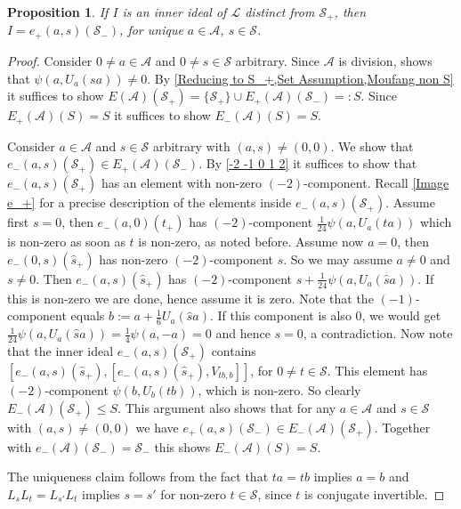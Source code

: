 \documentclass[oneside,a4paper]{amsart} %
\newtheorem{proposition}[theorem]{Proposition}
\theoremstyle{definition}
\newcommand{\A}{\mathcal{A}}
\renewcommand{\SS}{\mathcal{S}}
\newcommand{\LL}{\mathcal{L}}
\numberwithin{equation}{section}
\begin{document}
\begin{proposition}
\label{Moufang skews inner}
	If $I$ is an inner ideal of $\LL$ distinct from $\mathcal S_+$, then $I=e_+(a,s)(\SS_-)$, for unique $a\in\mathcal A$, $s\in\mathcal S$.
\end{proposition}
\begin{proof}
	Consider $0\neq a\in\A$ and $0\neq s\in\SS$ arbitrary.
	Since $\A$ is division, \cite[Lemma 3.3.4(ii)]{Boelaert2019} shows that $\psi(a,U_a(sa))\neq 0$.
	By \cref{Reducing to S_+,Set Assumption,Moufang non S} it suffices to show $E(\A)(\SS_+)=\{\SS_+\}\cup E_+(\A)(\SS_-)=:S$.
	Since $E_+(\A)(S)=S$ it suffices to show $E_-(\A)(S)=S$.
	
	Consider $a\in\A$ and $s\in\SS$ arbitrary with $(a,s)\neq (0,0)$.
	We show that $e_-(a,s)(\SS_+)\in E_+(\A)(\SS_-)$.
	By \cref{-2 -1 0 1 2} it suffices to show that $e_-(a,s)(\SS_+)$ has an element with non-zero $(-2)$-component.
	Recall \cref{Image e_+} for a precise description of the elements inside $e_-(a,s)(\SS_+)$.
	Assume first $s=0$, then $e_-(a,0)(t_+)$ has $(-2)$-component $\frac{1}{24}\psi (a,U_a(ta))$ which is non-zero as soon as $t$ is non-zero, as noted before.
	Assume now $a=0$, then $e_-(0,s)(\hat s_+)$ has non-zero $(-2)$-component $s$.
	So we may assume $a\neq 0$ and $s\neq 0$.
	Then $e_-(a,s)(\hat s_+)$ has $(-2)$-component $s+\frac{1}{24}\psi (a,U_a(\hat s a))$.
	If this is non-zero we are done, hence assume it is zero.
	Note that the $(-1)$-component equals $b:=a+\frac 1 6 U_a(\hat s a)$.
	If this component is also $0$, we would get $\frac{1}{24}\psi (a,U_a(\hat s a))=\frac{1}{4}\psi (a,-a)=0$ and hence $s=0$, a contradiction. 
	Now note that the inner ideal $e_-(a,s)(\SS_+)$ contains $[e_-(a,s)(\hat s_+),[e_-(a,s)(\hat s_+),V_{t b,b}]]$, for $0\neq t\in\SS$.
	This element has $(-2)$-component $\psi (b,U_b(tb))$, which is non-zero.
	So clearly $E_-(\A)(\SS_+)\leq S$.
	This argument also shows that for any $a\in\A$ and $s\in\SS$ with $(a,s)\neq (0,0)$ we have $e_+(a,s)(\SS_-)\in E_-(\A)(\SS_+)$.
	Together with $e_-(\A)(\SS_-)=\SS_-$ this shows $E_-(\A)(S)=S$.
	
	The uniqueness claim follows from the fact that $ta=tb$ implies $a=b$  and $L_sL_t=L_{s'}L_t$ implies $s=s'$ for non-zero $t\in\SS$, since $t$ is conjugate invertible.
\end{proof}
\end{document}
